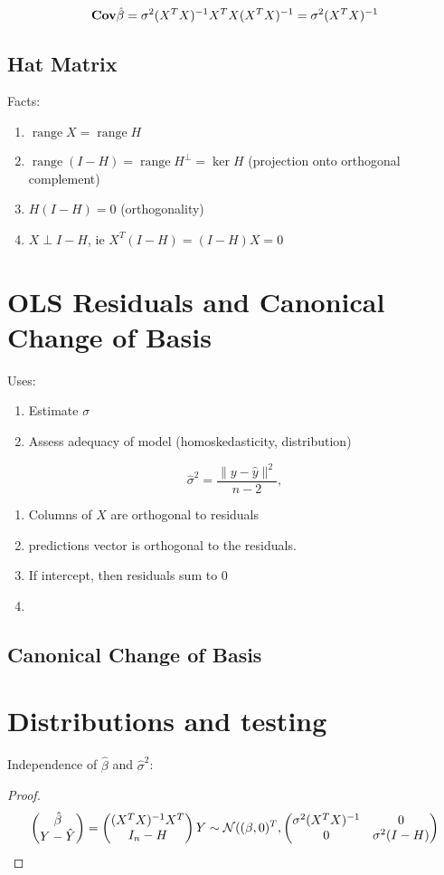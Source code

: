 \documentclass{article}
\newcommand{\range}{\operatorname{range}}
\begin{document}
$$\mathbf{Cov} \hat \beta = \sigma^2 (X^T X)^{-1} X^T X (X^TX)^{-1} = \sigma^2 (X^TX)^{-1} $$



\subsection{Hat Matrix}
Facts:
\begin{enumerate}
	\item $\range X = \range H$
	\item $\range (I-H) = \range H^\perp = \ker H$ (projection onto orthogonal complement)
	\item $H(I- H) = 0$ (orthogonality)
	\item $X \perp I - H$, ie $X^T (I - H) =(I-H)X = 0$
\end{enumerate}



\section{OLS Residuals and Canonical Change of Basis}
Uses:
\begin{enumerate}
    \item Estimate $\sigma$
    \item Assess adequacy of model (homoskedasticity, distribution)
\end{enumerate}
$$\hat \sigma^2 = \frac{\|y-\hat y\|^2}{n-2},$$
\begin{enumerate}
	\item Columns of $X$ are orthogonal to residuals
	\item  predictions vector is orthogonal to the residuals. 
	\item If intercept, then residuals sum to $0$
	\item 
\end{enumerate}
\subsection{Canonical Change of Basis}

\section{Distributions and testing}
\begin{fact}
    Independence of $\hat \beta$ and $\hat \sigma^2$:
    \begin{proof}
    	
	$$\begin{pmatrix}
		\hat \beta \\
		Y - \hat Y 
	\end{pmatrix} = \begin{pmatrix}
		(X^TX)^{-1} X^T \\
		I_n - H
	\end{pmatrix}Y \sim \mathcal N ((\beta,0)^T, \begin{pmatrix}
		\sigma^2 (X^TX)^{-1} & 0 \\
		0 & \sigma^2 (I - H)
	\end{pmatrix}$$
	    \end{proof}
\end{fact}
\end{document}
